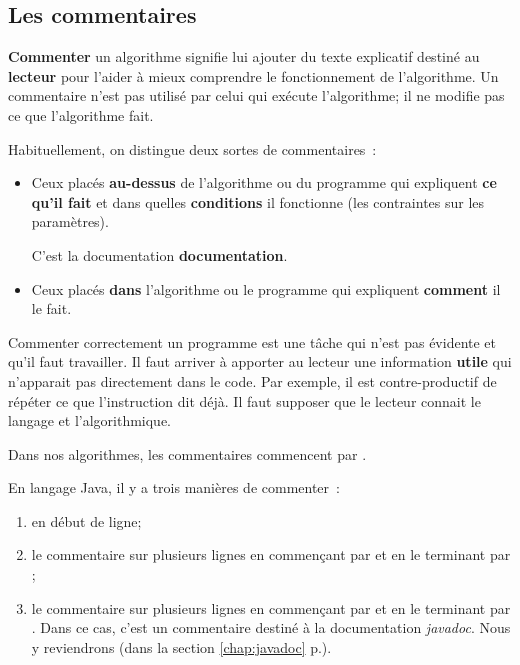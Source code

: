 				
		\subsection{Les commentaires}
		\label{section:commentaires}
	
			\textbf{Commenter} un algorithme
			signifie lui ajouter du texte explicatif
			destiné au \textbf{lecteur} pour l’aider à mieux
			comprendre le fonctionnement de l’algorithme.
			Un commentaire n’est pas utilisé par celui qui exécute
			l’algorithme; il ne modifie pas ce que l’algorithme fait.
			
			Habituellement, on distingue deux sortes de commentaires~:
			\begin{itemize}
			\item
				Ceux placés \textbf{au-dessus} de l’algorithme ou du programme
				qui expliquent \textbf{ce qu'il fait} 
				et dans quelles \textbf{conditions} il fonctionne
				(les contraintes sur les paramètres).
				\par C'est la documentation \textbf{documentation}.
			\item
				Ceux placés \textbf{dans} l’algorithme ou le programme
				qui expliquent \textbf{comment} il le fait.
			\end{itemize}
			
			Commenter correctement un programme est une tâche qui n’est pas
			évidente et qu’il faut travailler.  Il faut arriver à apporter au
			lecteur une information \textbf{utile} qui n’apparait pas
			directement dans le code.  Par exemple, il est contre-productif de
			répéter ce que l’instruction dit déjà. Il faut supposer que le 
			lecteur connait le langage et l'algorithmique.   

			Dans nos algorithmes, les commentaires commencent par \pc{//}. 

			En langage Java, il y a trois manières de commenter~:

			\begin{enumerate}
				\item \pc{//} en début de ligne;
				\item le commentaire sur plusieurs lignes en commençant par 
					\pc{/*} et en le terminant par \pc{*/};
					

				\item le commentaire sur plusieurs lignes en commençant par 
					\pc{/**} et en le terminant par \pc{*/}. Dans ce cas, 
					c'est un commentaire destiné à la documentation 
					\textit{javadoc}. Nous y reviendrons (dans la section
					\ref{chap:javadoc} p.\pageref{chap:javadoc}). 
			\end{enumerate}
			

